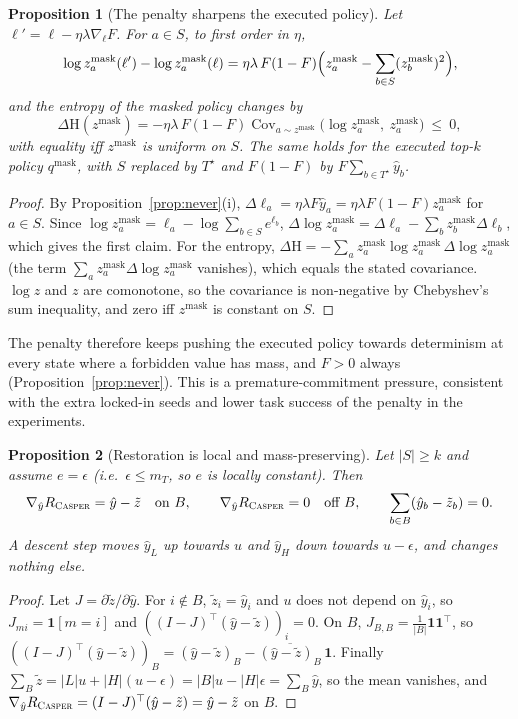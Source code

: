 \documentclass[11pt]{article}
\providecommand{\casper}{\textnormal{\textsc{Casper}}}
\newcommand{\yh}{\hat y}
\newcommand{\zt}{\tilde z}
\newcommand{\zm}{z^{\mathrm{mask}}}
\newcommand{\1}{\mathbf 1}
\newcommand{\Rc}{R_{\casper}}
\newcommand{\Ent}{\mathrm{H}}
\newtheorem{proposition}{Proposition}
\theoremstyle{definition}
\theoremstyle{remark}
\begin{document}
\begin{proposition}[The penalty sharpens the executed policy]\label{prop:sharpen}
Let $\ell'=\ell-\eta\lambda\nabla_\ell F$. For $a\in S$, to first order in $\eta$,
\[
\log\zm_a(\ell')-\log\zm_a(\ell)=\eta\lambda\,F(1-F)\Bigl(\zm_a-\sum_{b\in S}(\zm_b)^2\Bigr),
\]
and the entropy of the masked policy changes by
\[
\Delta\Ent(\zm)=-\eta\lambda\,F(1-F)\operatorname{Cov}_{a\sim\zm}\bigl(\log\zm_a,\ \zm_a\bigr)\ \le\ 0,
\]
with equality iff $\zm$ is uniform on $S$. The same holds for the executed top-$k$ policy
$q^{\mathrm{mask}}$, with $S$ replaced by $T^\star$ and $F(1-F)$ by $F\sum_{b\in T^\star}\yh_b$.
\end{proposition}
\begin{proof}
By Proposition~\ref{prop:never}(i), $\Delta\ell_a=\eta\lambda F\yh_a=\eta\lambda F(1-F)\zm_a$ for
$a\in S$. Since $\log\zm_a=\ell_a-\log\sum_{b\in S}e^{\ell_b}$,
$\Delta\log\zm_a=\Delta\ell_a-\sum_b\zm_b\Delta\ell_b$, which gives the first claim. For the entropy,
$\Delta\Ent=-\sum_a\zm_a\log\zm_a\,\Delta\log\zm_a$ (the term $\sum_a\zm_a\Delta\log\zm_a$ vanishes),
which equals the stated covariance. $\log z$ and $z$ are comonotone, so the covariance is
non-negative by Chebyshev's sum inequality, and zero iff $\zm$ is constant on $S$.
\end{proof}

The penalty therefore keeps pushing the executed policy towards determinism at every state where a
forbidden value has mass, and $F>0$ always (Proposition~\ref{prop:never}). This is a
premature-commitment pressure, consistent with the extra locked-in seeds and lower task success of
the penalty in the experiments.

\begin{proposition}[Restoration is local and mass-preserving]\label{prop:local}
Let $|S|\ge k$ and assume $e=\epsilon$ (i.e.\ $\epsilon\le m_T$, so $e$ is locally constant). Then
\[
\nabla_{\yh}\Rc=\yh-\zt\quad\text{on }B,\qquad \nabla_{\yh}\Rc=0\quad\text{off }B,\qquad
\sum_{b\in B}(\yh_b-\zt_b)=0 .
\]
A descent step moves $\yh_L$ up towards $u$ and $\yh_H$ down towards $u-\epsilon$, and changes
nothing else.
\end{proposition}
\begin{proof}
Let $J=\partial\zt/\partial\yh$. For $i\notin B$, $\zt_i=\yh_i$ and $u$ does not depend on $\yh_i$, so
$J_{mi}=\1[m=i]$ and $((I-J)^\top(\yh-\zt))_i=0$. On $B$, $J_{B,B}=\frac1{|B|}\mathbf 1\mathbf
1^\top$, so $((I-J)^\top(\yh-\zt))_B=(\yh-\zt)_B-\overline{(\yh-\zt)_B}\,\mathbf 1$. Finally
$\sum_B\zt=|L|u+|H|(u-\epsilon)=|B|u-|H|\epsilon=\sum_B\yh$, so the mean vanishes, and
$\nabla_{\yh}\Rc=(I-J)^\top(\yh-\zt)=\yh-\zt$ on $B$.
\end{proof}
\end{document}
